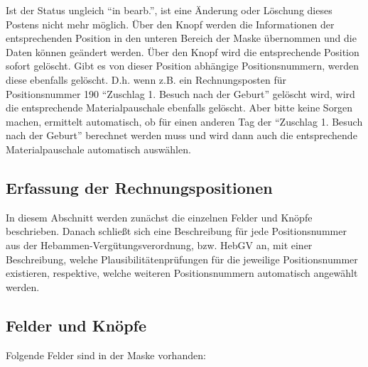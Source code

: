 Ist der Status ungleich ``in bearb.'', ist eine Änderung oder Löschung
dieses Postens nicht mehr möglich.
Über den Knopf  werden die Informationen der entsprechenden
Position in den unteren Bereich der Maske übernommen und die Daten können
geändert werden.
Über den Knopf  wird die entsprechende Position sofort
gelöscht. Gibt es von dieser Position abhängige Positionsnummern, werden
diese ebenfalls gelöscht. D.h. wenn z.B. ein Rechnungsposten für 
Positionsnummer 190 ``Zuschlag 1. Besuch nach der Geburt'' gelöscht wird,
wird die entsprechende Materialpauschale ebenfalls gelöscht. Aber bitte
keine Sorgen machen, \tinyHeb\/ ermittelt automatisch, ob für einen
anderen Tag der ``Zuschlag 1. Besuch nach der Geburt'' berechnet werden
muss und wird dann auch die entsprechende Materialpauschale automatisch
auswählen.

\subsection{Erfassung der Rechnungspositionen}
In diesem Abschnitt werden zunächst die einzelnen Felder und Knöpfe
beschrieben. Danach schließt sich eine Beschreibung für jede
Positionsnummer aus der Hebammen-Vergütungs\-ver\-ordnung, bzw. HebGV an, 
mit einer Beschreibung, welche
Plausibilitätenprüfungen für die jeweilige Positionsnummer existieren,
respektive, welche weiteren Positionsnummern automatisch angewählt werden.

\subsection{Felder und Knöpfe}
Folgende Felder sind in der Maske vorhanden:

